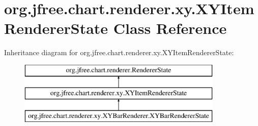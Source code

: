 \hypertarget{classorg_1_1jfree_1_1chart_1_1renderer_1_1xy_1_1_x_y_item_renderer_state}{}\section{org.\+jfree.\+chart.\+renderer.\+xy.\+X\+Y\+Item\+Renderer\+State Class Reference}
\label{classorg_1_1jfree_1_1chart_1_1renderer_1_1xy_1_1_x_y_item_renderer_state}
Inheritance diagram for org.\+jfree.\+chart.\+renderer.\+xy.\+X\+Y\+Item\+Renderer\+State\+:\begin{figure}[H]
\begin{center}
\leavevmode
\includegraphics[height=3.000000cm]{classorg_1_1jfree_1_1chart_1_1renderer_1_1xy_1_1_x_y_item_renderer_state}
\end{center}
\end{figure}
